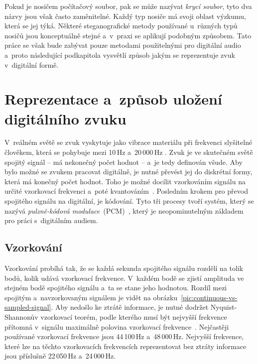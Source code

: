 Pokud je nosičem počítačový soubor, pak se může nazývat \textit{krycí soubor},
tyto dva názvy jsou však často zaměnitelné. Každý typ nosiče má svoji oblast
výzkumu, která se jej týká. Některé steganografické metody používané u~různých
typů nosičů jsou konceptuálně stejné a~v~praxi se aplikují podobným způsobem.
Tato práce se však bude zabývat pouze metodami použitelnými pro digitální
audio a~proto následující podkapitola vysvětlí způsob jakým se reprezentuje
zvuk v~digitální formě.

\section{Reprezentace a~způsob uložení digitálního zvuku}
\label{sec:digital-sound-representation}

V~reálném světě se zvuk vyskytuje jako vibrace materiálu při frekvenci
slyšitelné člověkem, která se pohybuje mezi 10\,Hz a~20\,000\,Hz
\cite{Swanson1998}. Zvuk je ve skutečném světě spojitý signál -- má nekonečný
počet hodnot -- a~je tedy definován všude. Aby bylo možné se zvukem pracovat
digitálně, je nutné převést jej do diskrétní formy, která má konečný počet
hodnot. Toho je možné docílit vzorkováním signálu na určité vzorkovací
frekvenci a~poté kvantováním~\cite{Cernocky2021}. Posledním krokem pro převod
spojitého signálu na digitální, je kódování. Tyto tři procesy tvoří systém,
který se nazývá \textit{pulzně-kódová modulace}~(PCM)~\cite{Oliver1948}, který
je neopominutelným základem pro práci s~digitálním audiem.

\subsection*{Vzorkování}
\label{sub:sampling}

Vzorkování probíhá tak, že se každá sekunda spojitého signálu rozdělí na tolik
bodů, kolik udává vzorkovací frekvence. V~každém bodě se zjistí amplituda ve
stejném bodě spojitého signálu a~ta se stane jeho hodnotou. Rozdíl mezi
spojitým a~navzorkovaným signálem je vidět na
obrázku~\ref{pic:continuous-vs-sampled-signal}. Aby nedošlo ke ztrátě
informace, je nutné dodržet Nyquist-Shannonův vzorkovací teorém, podle kterého
musí být nejvyšší frekvence přítomná v~signálu maximálně polovina vzorkovací
frekvence~\cite{Shannon1949}. Nejčastěji používané vzorkovací frekvence jsou
44\,100\,Hz a~48\,000\,Hz. Nejvyšší frekvence, které lze na těchto vzorkovacích
frekvencích reprezentovat bez ztráty informace jsou příslušně 22\,050\,Hz
a~24\,000\,Hz.

